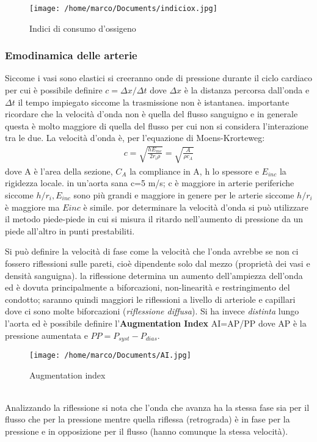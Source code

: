 \documentclass[10pt]{article}
\begin{document}
 \begin{figure}[h!]
\centering
\texttt{[image: /home/marco/Documents/indiciox.jpg]}
\caption{Indici di consumo d'ossigeno}
\label{fig:Indiciox}
\end{figure}

\subsubsection{Emodinamica delle arterie}

Siccome i vasi sono elastici si creeranno onde di pressione durante il ciclo cardiaco per cui è possibile definire $c=\Delta x/\Delta t$ dove $\Delta x$ è la distanza percorsa dall'onda e $\Delta t$ il tempo impiegato siccome la trasmissione non è istantanea.  importante ricordare che la velocità d'onda non è quella del flusso sanguigno e in generale  questa è molto maggiore di quella del flusso per cui non si considera l'interazione tra le due.
La velocità d'onda è, per l'equazione di Moens-Krorteweg: \begin{align*}
    c=\sqrt{\frac{h E_{mc}}{2 r_i \rho}}=\sqrt{\frac{A}{\rho c_A}}
\end{align*}
dove A è l'area della sezione, $C_A$ la compliance in A, h lo spessore e $E_{inc}$ la rigidezza locale. \textrightarrow in un'aorta sana c=5 m/s; c è maggiore in arterie periferiche siccome $h/r_i, E_{inc}$ sono più grandi e maggiore in genere per le arterie siccome $h/r_i $ è maggiore ma $E{inc}$ è simile. \textrightarrow por determinare la velocità d'onda si può utilizzare il metodo piede-piede in cui si misura il ritardo nell'aumento di pressione da un piede all'altro in punti prestabiliti.

Si può definire la velocità di fase come la velocità che l'onda avrebbe se non ci fossero riflessioni sulle pareti, cioè dipendente solo dal mezzo (proprietà dei vasi e densità sanguigna). \textrightarrow la riflessione determina un aumento dell'ampiezza dell'onda ed è dovuta principalmente a biforcazioni, non-linearità e restringimento del condotto; saranno quindi maggiori le riflessioni a livello di arteriole e capillari dove ci sono molte biforcazioni (\textit{riflessione diffusa}).
Si ha invece \textit{distinta} lungo l'aorta ed è possibile definire l'\textbf{Augmentation Index} AI=AP/PP dove AP è la pressione aumentata e $PP=P_{syst}-P_{dias}$. 
 \begin{figure}[h!]
\centering
\texttt{[image: /home/marco/Documents/AI.jpg]}
\caption{Augmentation index}
\label{fig:AI}
\end{figure}\\
Analizzando la riflessione si nota che l'onda che avanza ha la stessa fase sia per il flusso che per la pressione mentre quella riflessa (retrograda) è in fase per la pressione e in opposizione per il flusso (hanno comunque la stessa velocità).
\end{document}
